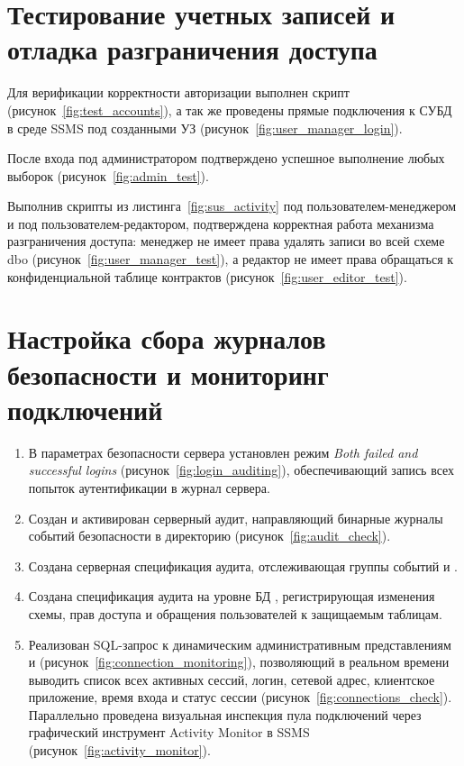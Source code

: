 \section{Тестирование учетных записей и отладка разграничения доступа}

Для верификации корректности авторизации выполнен скрипт  (рисунок~\ref{fig:test_accounts}), а так же проведены прямые подключения к СУБД в среде SSMS под созданными УЗ (рисунок~\ref{fig:user_manager_login}).

После входа под администратором подтверждено успешное выполнение любых выборок (рисунок~\ref{fig:admin_test}).

Выполнив скрипты из листинга~\ref{fig:sus_activity} под пользователем-менеджером и под пользователем-редактором, подтверждена корректная работа механизма разграничения доступа: менеджер не имеет права удалять записи во всей схеме dbo (рисунок~\ref{fig:user_manager_test}), а редактор не имеет права обращаться к конфиденциальной таблице контрактов (рисунок~\ref{fig:user_editor_test}).

\section{Настройка сбора журналов безопасности и мониторинг подключений}

\begin{enumerate}
    \item В параметрах безопасности сервера установлен режим \textit{Both failed and successful logins} (рисунок~\ref{fig:login_auditing}), обеспечивающий запись всех попыток аутентификации в журнал сервера.
    \item Создан и активирован серверный аудит, направляющий бинарные журналы событий безопасности  в директорию  (рисунок~\ref{fig:audit_check}).
    \item Создана серверная спецификация аудита, отслеживающая группы событий  и .
    \item Создана спецификация аудита на уровне БД , регистрирующая изменения схемы, прав доступа и обращения пользователей к защищаемым таблицам.
    \item Реализован SQL-запрос к динамическим административным представлениям  и  (рисунок~\ref{fig:connection_monitoring}), позволяющий в реальном времени выводить список всех активных сессий, логин, сетевой адрес, клиентское приложение, время входа и статус сессии (рисунок~\ref{fig:connections_check}). Параллельно проведена визуальная инспекция пула подключений через графический инструмент Activity Monitor в SSMS (рисунок~\ref{fig:activity_monitor}).
\end{enumerate}

